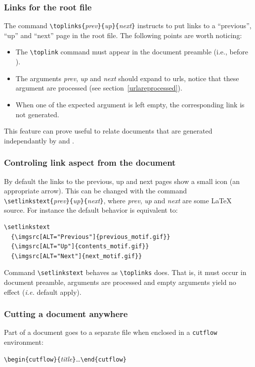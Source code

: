\subsubsection{Links for the root file}
The command \verb+\toplinks{+\textit{prev}\verb+}{+\textit{up}\verb+}{+\textit{next}\verb+}+ instructs \hacha{}  to put links to a
``previous'', ``up'' and ``next'' page in the root file.
The following points are worth noticing:
\begin{itemize}
\item The \verb+\toplink+ command must appear in the document preamble
(i.e., before \verb++).
\item The arguments
\textit{prev}, \textit{up} and \textit{next} should expand to urls,
notice that these argument are processed (see section~\ref{urlareprocessed}).
\item When one of the expected argument is left empty,
the corresponding link is not generated.
\end{itemize}
This feature can prove useful to
relate documents that are generated independantly by
\hevea{} and \hacha{}.

\subsubsection{Controling link aspect from the document}
%
By default the links to the previous, up and next pages show a small
icon (an appropriate arrow). This can be changed with the command
\verb+\setlinkstext{+\textit{prev}\verb+}{+\textit{up}\verb+}{+\textit{next}\verb+}+,
where \textit{prev}, \textit{up} and \textit{next} are some \LaTeX{}
source.
For instance the default behavior is equivalent to:
\begin{verbatim}
\setlinkstext
  {\imgsrc[ALT="Previous"]{previous_motif.gif}}
  {\imgsrc[ALT="Up"]{contents_motif.gif}}
  {\imgsrc[ALT="Next"]{next_motif.gif}}
\end{verbatim}
Command \verb+\setlinkstext+ behaves as \verb+\toplinks+ does.
That is, it must occur in document preamble, arguments are processed
and empty arguments yield no effect (\emph{i.e.} default apply).

\subsubsection{Cutting a document anywhere}
Part of a document goes to a separate file when enclosed in a
\verb+cutflow+ environment:
\begin{flushleft}
  \verb+\begin{cutflow}{+\textit{title}\verb+}+\ldots\verb+\end{cutflow}+
\end{flushleft}

